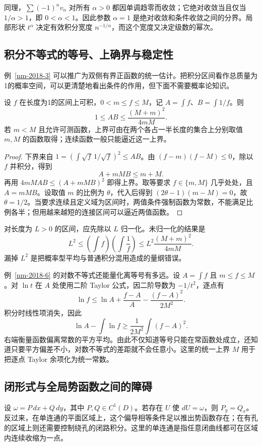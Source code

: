 \documentclass[UTF8,12pt,a4paper,fontset=fandol]{ctexart}
\begin{document}
同理，$\sum(-1)^nv_n$ 对所有 $\alpha>0$ 都因单调趋零而收敛；它绝对收敛当且仅当 $1/\alpha>1$，即 $0<\alpha<1$。因此参数 $\alpha=1$ 是绝对收敛和条件收敛之间的分界。局部形状 $t^\alpha$ 决定有效积分宽度 $n^{-1/\alpha}$，而这个宽度又决定级数的幂次。

\subsection{积分不等式的等号、上确界与稳定性}
例~\ref{nm-2018-3} 可以推广为双侧有界正函数的统一估计。把积分区间看作总质量为1的概率空间，可以更清楚地看出条件的作用，但下面不需要概率论知识。

\begin{theorem}[正函数与倒数的积分乘积]\label{supp-kantorovich}
设 $f$ 在长度为1的区间上可积，$0<m\leq f\leq M$，记 $A=\int f$、$B=\int1/f$。则
\[
 1\leq AB\leq\frac{(M+m)^2}{4mM}.
\]
若 $m<M$ 且允许可测函数，上界可由在两个各占一半长度的集合上分别取值 $m,M$ 的函数取得；连续函数一般只能逼近这一上界。
\end{theorem}
\begin{proof}
下界来自 $1=(\int\sqrt f\,1/\sqrt f)^2\leq AB$。由 $(f-m)(f-M)\leq0$，除以 $f$ 并积分，得到
\[
 A+mMB\leq m+M.
\]
再用 $4mMAB\leq(A+mMB)^2$ 即得上界。取等要求 $f\in\{m,M\}$ 几乎处处，且 $A=mMB$。设取值 $m$ 的比例为 $\theta$，代入后得到 $(2\theta-1)(m-M)=0$，故 $\theta=1/2$。当要求连续且定义域为区间时，两值条件强制函数为常数，不能满足比例各半；但用越来越短的连接区间可以逼近两值函数。
\end{proof}

对长度为 $L>0$ 的区间，应先除以 $L$ 归一化。未归一化的结果是
\[
 L^2\leq\left(\int f\right)\left(\int\frac1f\right)
 \leq L^2\frac{(M+m)^2}{4mM}.
\]
漏掉 $L^2$ 是把概率型平均与普通积分混用造成的量纲错误。

例~\ref{nm-2018-6} 的对数不等式还能量化离等号有多远。设 $A=\int f$ 且 $m\leq f\leq M$。对 $\ln t$ 在 $A$ 处使用二阶 Taylor 公式，因二阶导数为 $-1/t^2$，逐点有
\[
 \ln f\leq\ln A+\frac{f-A}{A}-\frac{(f-A)^2}{2M^2}.
\]
积分时线性项消失，因此
\[
 \ln A-\int\ln f\geq\frac1{2M^2}\int(f-A)^2.
\]
右端衡量函数偏离常数的平方平均。由此不仅知道等号只能在常函数处成立，还知道只要平方偏差不小，对数不等式的差距就不会任意小。这里的统一上界 $M$ 用于把逐点 Taylor 余项化为统一常数。

\subsection{闭形式与全局势函数之间的障碍}
设 $\omega=P\,dx+Q\,dy$，其中 $P,Q\in C^1(D)$。若存在 $U$ 使 $dU=\omega$，则 $P_y=Q_x$。反过来，在单连通的平面区域上，这个偏导相等条件足以推出势函数存在；在有孔的区域上则还需要控制绕孔的闭路积分。这里的单连通是指任意闭曲线都可在区域内连续收缩为一点。
\end{document}
